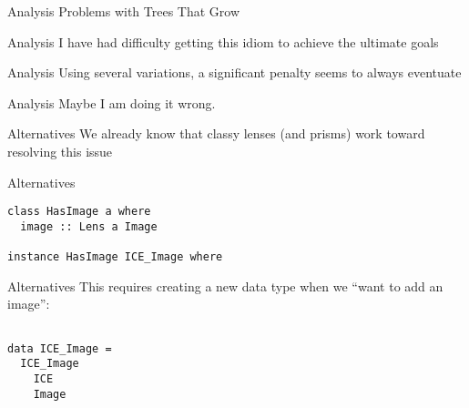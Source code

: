 \begin{frame}[fragile]
\begin{block}{Analysis}
Problems with Trees That Grow
\end{block}
\end{frame}

\begin{frame}[fragile]
\begin{block}{Analysis}
I have had difficulty getting this idiom to achieve the ultimate goals
\end{block}
\end{frame}

\begin{frame}[fragile]
\begin{block}{Analysis}
Using several variations, a significant penalty seems to always eventuate
\end{block}
\end{frame}

\begin{frame}[fragile]
\begin{block}{Analysis}
Maybe I am doing it wrong.
\end{block}
\end{frame}

\begin{frame}[fragile]
\begin{block}{Alternatives}
We already know that classy lenses (and prisms) work toward resolving this issue
\end{block}
\end{frame}

\begin{frame}[fragile]
\begin{block}{Alternatives}
\begin{lstlisting}[style=haskell]
class HasImage a where
  image :: Lens a Image

instance HasImage ICE_Image where
\end{lstlisting}
\end{block}
\end{frame}

\begin{frame}[fragile]
\begin{block}{Alternatives}
This requires creating a new data type when we ``want to add an image'':
\begin{lstlisting}[style=haskell]

data ICE_Image =
  ICE_Image
    ICE
    Image
\end{lstlisting}
\end{block}
\end{frame}


